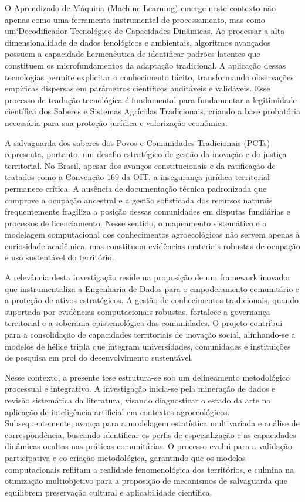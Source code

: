 O Aprendizado de Máquina (Machine Learning) emerge neste contexto não apenas como uma ferramenta instrumental de processamento, mas como um`Decodificador Tecnológico de Capacidades Dinâmicas. Ao processar a alta dimensionalidade de dados fenológicos e ambientais, algoritmos avançados possuem a capacidade hermenêutica de identificar padrões latentes que constituem os microfundamentos da adaptação tradicional. A aplicação dessas tecnologias permite explicitar o conhecimento tácito, transformando observações empíricas dispersas em parâmetros científicos auditáveis e validáveis. Esse processo de tradução tecnológica é fundamental para fundamentar a legitimidade científica dos Saberes e Sistemas Agrícolas Tradicionais, criando a base probatória necessária para sua proteção jurídica e valorização econômica.

A salvaguarda dos saberes dos Povos e Comunidades Tradicionais (PCTs) representa, portanto, um desafio estratégico de gestão da inovação e de justiça territorial. No Brasil, apesar dos avanços constitucionais e da ratificação de tratados como a Convenção 169 da OIT, a insegurança jurídica territorial permanece crítica. A ausência de documentação técnica padronizada que comprove a ocupação ancestral e a gestão sofisticada dos recursos naturais frequentemente fragiliza a posição dessas comunidades em disputas fundiárias e processos de licenciamento. Nesse sentido, o mapeamento sistemático e a modelagem computacional dos conhecimentos agroecológicos não servem apenas à curiosidade acadêmica, mas constituem evidências materiais robustas de ocupação e uso sustentável do território.


A relevância desta investigação reside na proposição de um framework inovador que instrumentaliza a Engenharia de Dados para o empoderamento comunitário e a proteção de ativos estratégicos. A gestão de conhecimentos tradicionais, quando suportada por evidências computacionais robustas, fortalece a governança territorial e a soberania epistemológica das comunidades. O projeto contribui para a consolidação de capacidades territoriais de inovação social, alinhando-se a modelos de hélice tripla que integram universidades, comunidades e instituições de pesquisa em prol do desenvolvimento sustentável.

Nesse contexto, a presente tese estrutura-se sob um delineamento metodológico processual e integrativo. A investigação inicia-se pela mineração de dados e revisão sistemática da literatura, visando diagnosticar o estado da arte na aplicação de inteligência artificial em contextos agroecológicos. Subsequentemente, avança para a modelagem estatística multivariada e análise de correspondência, buscando identificar os perfis de especialização e as capacidades dinâmicas ocultas nas práticas comunitárias. O processo evolui para a validação participativa e co-criação metodológica, garantindo que os modelos computacionais reflitam a realidade fenomenológica dos territórios, e culmina na otimização multiobjetivo para a proposição de mecanismos de salvaguarda que equilibrem preservação cultural e aplicabilidade científica.

